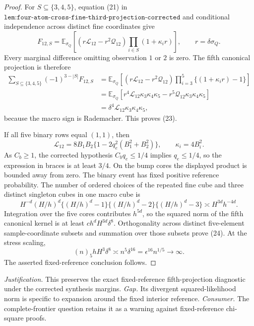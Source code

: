 \documentclass{article}
\begin{document}
\begin{proof}
For \(S\subseteq\{3,4,5\}\), equation (21) in \(\texttt{lem:four-atom-cross-fine-third-projection-corrected}\) and conditional independence across distinct fine coordinates give
\[
 F_{12,S}=\mathbb E_{\sigma_Q}\left[
 (r\mathcal L_{12}-r^2\mathcal Q_{12})
 \prod_{i\in S}(1+\kappa_ir)\right],
 \qquad r=\delta\sigma_Q.
\]
Every marginal difference omitting observation \(1\) or \(2\) is zero.  The fifth canonical projection is therefore
\[
 \begin{aligned}
 \sum_{S\subseteq\{3,4,5\}}(-1)^{3-|S|}F_{12,S}
 &=\mathbb E_{\sigma_Q}\left[
 (r\mathcal L_{12}-r^2\mathcal Q_{12})
 \prod_{i=3}^5\{(1+\kappa_ir)-1\}\right]\\
 &=\mathbb E_{\sigma_Q}\left[
 r^4\mathcal L_{12}\kappa_3\kappa_4\kappa_5
 -r^5\mathcal Q_{12}\kappa_3\kappa_4\kappa_5\right]\\
 &=\delta^4\mathcal L_{12}\kappa_3\kappa_4\kappa_5,
 \end{aligned}
\]
because the macro sign is Rademacher.  This proves (23).

If all five binary rows equal \((1,1)\), then
\[
 \mathcal L_{12}=8B_1B_2\{1-2q_e^2(B_1^2+B_2^2)\},
 \qquad \kappa_i=4B_i^2.
\]
As \(C_b\geq1\), the corrected hypothesis \(C_bq_e\leq1/4\) implies \(q_e\leq1/4\), so the expression in braces is at least \(3/4\).  On the bump cores the displayed product is bounded away from zero.  The binary event has fixed positive reference probability.  The number of ordered choices of the repeated fine cube and three distinct singleton cubes in one macro cube is
\[
 H^{-d}(H/h)^d\{(H/h)^d-1\}\{(H/h)^d-2\}\{(H/h)^d-3\}
 \asymp H^{3d}h^{-4d}.
\]
Integration over the five cores contributes \(h^{5d}\), so the squared norm of the fifth canonical kernel is at least \(ch^dH^{3d}\delta^8\).  Orthogonality across distinct five-element sample-coordinate subsets and summation over those subsets prove (24).  At the stress scaling,
\[
 (n)_5hH^3\delta^8\asymp n^5\delta^{16}
 =\epsilon^{16}n^{1/5}\longrightarrow\infty.
\]
The asserted fixed-reference conclusion follows.
\end{proof}
\par\smallskip\noindent \textit{Justification.} This preserves the exact fixed-reference fifth-projection diagnostic under the corrected synthesis margins. \textit{Gap.} Its divergent squared-likelihood norm is specific to expansion around the fixed interior reference. \textit{Consumer.} The complete-frontier question retains it as a warning against fixed-reference chi-square proofs.
\end{document}
